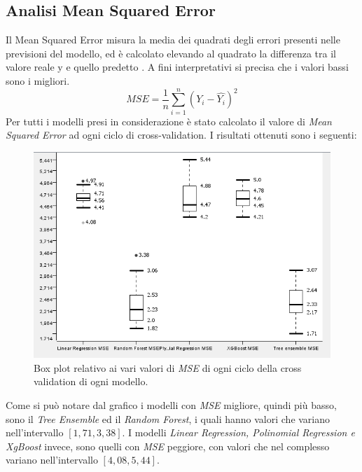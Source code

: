 \documentclass[12pt, a4paper, twocolumn]{article} %
\begin{document}
\subsection{Analisi Mean Squared Error}
Il Mean Squared Error misura la media dei quadrati degli errori presenti nelle previsioni del modello, ed è calcolato elevando al quadrato la differenza tra il valore reale y e quello predetto \cite{mse}. A fini interpretativi si precisa che i valori bassi sono i migliori.
\[MSE = \frac{1}{n} \displaystyle\sum_{i=1} ^{n} (Y_{i}-\widehat{Y_{i}})^{2}\]
Per tutti i modelli presi in considerazione è stato calcolato il valore di \textit{Mean Squared Error} ad ogni ciclo di cross-validation.
I risultati ottenuti sono i seguenti:
\begin{figure}[H]
  \includegraphics[scale=0.5]{./Immagini/boxplot-mse.png}
  \caption{Box plot relativo ai vari valori di \textit{MSE} di ogni ciclo della cross validation di ogni modello.}
\end{figure}
Come si può notare dal grafico i modelli con \textit{MSE} migliore, quindi più basso, sono il \textit{Tree Ensemble} ed il \textit{Random Forest}, i quali hanno valori che variano nell'intervallo $[1,71, 3,38]$. I modelli \textit{Linear Regression, Polinomial Regression e XgBoost} invece, sono quelli con \textit{MSE} peggiore, con valori che nel complesso variano nell'intervallo $[4,08 , 5,44]$.
\end{document}

